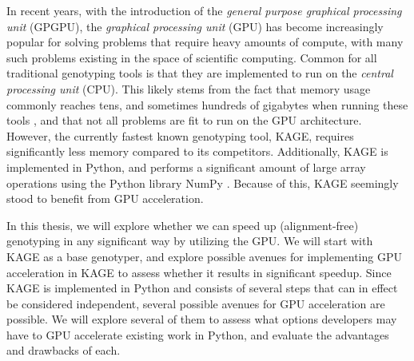 In recent years, with the introduction of the \textit{general purpose graphical processing unit} (GPGPU), the \textit{graphical processing unit} (GPU) has become increasingly popular for solving problems that require heavy amounts of compute, with many such problems existing in the space of scientific computing.
Common for all traditional genotyping tools is that they are implemented to run on the \textit{central processing unit} (CPU).
This likely stems from the fact that memory usage commonly reaches tens, and sometimes hundreds of gigabytes when running these tools \cite{kage}, and that not all problems are fit to run on the GPU architecture.
However, the currently fastest known genotyping tool, KAGE, requires significantly less memory compared to its competitors.
Additionally, KAGE is implemented in Python, and performs a significant amount of large array operations using the Python library NumPy \cite{numpy}.
Because of this, KAGE seemingly stood to benefit from GPU acceleration.

In this thesis, we will explore whether we can speed up (alignment-free) genotyping in any significant way by utilizing the GPU.
We will start with KAGE as a base genotyper, and explore possible avenues for implementing GPU acceleration in KAGE to assess whether it results in significant speedup.
Since KAGE is implemented in Python and consists of several steps that can in effect be considered independent, several possible avenues for GPU acceleration are possible.
We will explore several of them to assess what options developers may have to GPU accelerate existing work in Python, and evaluate the advantages and drawbacks of each.

